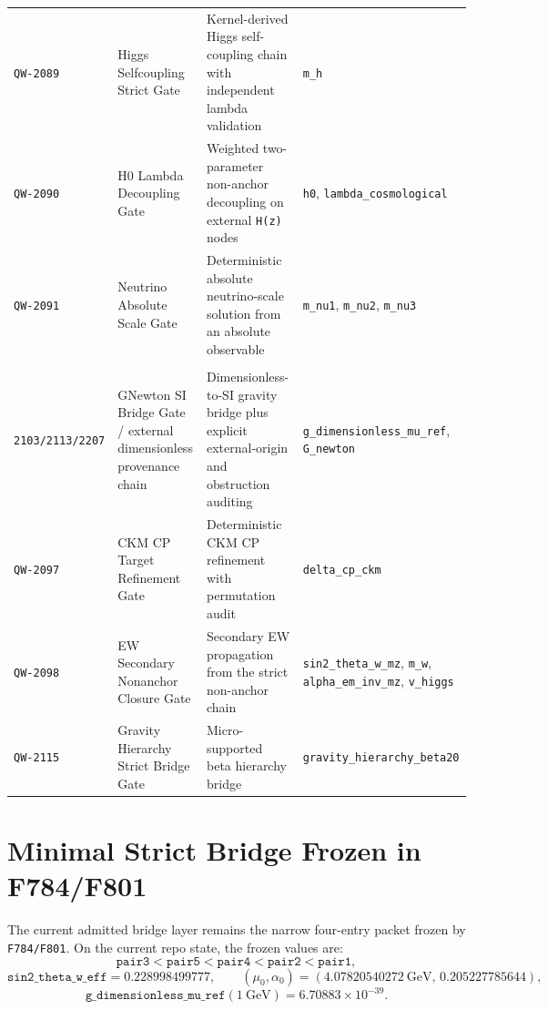 \begin{longtable}{@{}p{1.9cm}p{4.0cm}p{5.0cm}p{4.1cm}@{}}
\texttt{QW-2089} &
Higgs Selfcoupling Strict Gate &
Kernel-derived Higgs self-coupling chain with independent lambda validation &
\texttt{m\_h} \\

\texttt{QW-2090} &
H0 Lambda Decoupling Gate &
Weighted two-parameter non-anchor decoupling on external \texttt{H(z)} nodes &
\texttt{h0}, \texttt{lambda\_cosmological} \\

\texttt{QW-2091} &
Neutrino Absolute Scale Gate &
Deterministic absolute neutrino-scale solution from an absolute observable &
\texttt{m\_nu1}, \texttt{m\_nu2}, \texttt{m\_nu3} \\

\shortstack[l]{\texttt{QW-2092/2101/}\\\texttt{2103/2113/2207}} &
GNewton SI Bridge Gate / external dimensionless provenance chain &
Dimensionless-to-SI gravity bridge plus explicit external-origin and obstruction auditing &
\texttt{g\_dimensionless\_mu\_ref}, \texttt{G\_newton} \\

\texttt{QW-2097} &
CKM CP Target Refinement Gate &
Deterministic CKM CP refinement with permutation audit &
\texttt{delta\_cp\_ckm} \\

\texttt{QW-2098} &
EW Secondary Nonanchor Closure Gate &
Secondary EW propagation from the strict non-anchor chain &
\texttt{sin2\_theta\_w\_mz}, \texttt{m\_w}, \texttt{alpha\_em\_inv\_mz}, \texttt{v\_higgs} \\

\texttt{QW-2115} &
Gravity Hierarchy Strict Bridge Gate &
Micro-supported beta hierarchy bridge &
\texttt{gravity\_hierarchy\_beta20} \\
\bottomrule
\end{longtable}
\normalsize

\section{Minimal Strict Bridge Frozen in F784/F801}

The current admitted bridge layer remains the narrow four-entry packet frozen by
\texttt{F784/F801}. On the current repo state, the frozen values are:
\[
\texttt{pair3} < \texttt{pair5} < \texttt{pair4} < \texttt{pair2} < \texttt{pair1},
\]
\[
\texttt{sin2\_theta\_w\_eff} = 0.228998499777,
\qquad
(\mu_0,\alpha_0) = (4.07820540272\ \mathrm{GeV},\, 0.205227785644),
\]
\[
\texttt{g\_dimensionless\_mu\_ref}(1\ \mathrm{GeV}) = 6.70883\times 10^{-39}.
\]

